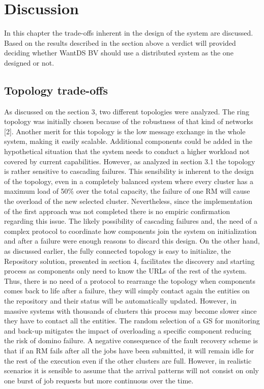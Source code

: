 \section{Discussion}
In this chapter the trade-offs inherent in the design of the system are discussed. Based on the results described in the section above a verdict will provided deciding whether WantDS BV should use a distributed system as the one designed or not.

\subsection{Topology trade-offs}
As discussed on the section 3, two different topologies were analyzed. The ring topology was initially chosen because of the robustness of that kind of networks [2]. Another merit for this topology is the low message exchange in the whole system, making it easily scalable. Additional components could be added in the hypothetical situation that the system needs to conduct a higher workload not covered by current capabilities. However, as analyzed in section 3.1 the topology is rather sensitive to cascading failures. This sensibility is inherent to the design of the topology, even in a completely balanced system where every cluster has a maximum load of 50\% over the total capacity, the failure of one RM will cause the overload of the new selected cluster. Nevertheless, since the implementation of the first approach was not completed there is no empiric confirmation regarding this issue. The likely possibility of cascading failures and, the need of a complex protocol to coordinate how components join the system on initialization and after a failure were enough reasons to discard this design. On the other hand, as discussed earlier, the fully connected topology is easy to initialize, the Repository solution, presented in section 4, facilitates the discovery and starting process as components only need to know the URLs of the rest of the system. Thus, there is no need of a protocol to rearrange the topology when components comes back to life after a failure, they will simply contact again the entities on the repository and their status will be automatically updated. However, in massive systems with thousands of clusters this process may become slower since they have to contact all the entities. The random selection of a GS for monitoring and back-up mitigates the impact of overloading a specific component reducing the risk of domino failure. A negative consequence of the fault recovery scheme is that if an RM fails after all the jobs have been submitted, it will remain idle for the rest of the execution even if the other clusters are full. However, in realistic scenarios it is sensible to assume that the arrival patterns will not consist on only one burst of job requests but more continuous over the time.

